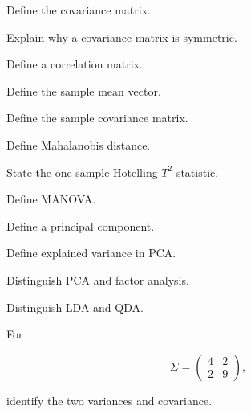 \begin{exercise}[1]
Define the covariance matrix.
\end{exercise}

\begin{exercise}[1]
Explain why a covariance matrix is symmetric.
\end{exercise}

\begin{exercise}[1]
Define a correlation matrix.
\end{exercise}

\begin{exercise}[1]
Define the sample mean vector.
\end{exercise}

\begin{exercise}[1]
Define the sample covariance matrix.
\end{exercise}

\begin{exercise}[1]
Define Mahalanobis distance.
\end{exercise}

\begin{exercise}[1]
State the one-sample Hotelling \(T^2\) statistic.
\end{exercise}

\begin{exercise}[1]
Define MANOVA.
\end{exercise}

\begin{exercise}[1]
Define a principal component.
\end{exercise}

\begin{exercise}[1]
Define explained variance in PCA.
\end{exercise}

\begin{exercise}[1]
Distinguish PCA and factor analysis.
\end{exercise}

\begin{exercise}[1]
Distinguish LDA and QDA.
\end{exercise}

\begin{exercise}[2]
For

\[
\Sigma
=
\begin{pmatrix}
4&2\\
2&9
\end{pmatrix},
\]

identify the two variances and covariance.
\end{exercise}

